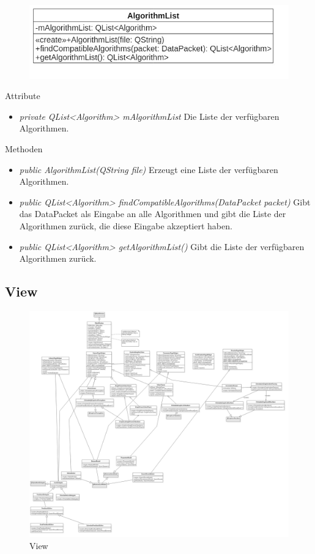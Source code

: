 \begin{figure}[H]
\centering
\includegraphics[scale=0.5]{img/Klassendiagramm/Klassen/AlgorithmList}
\label{fig:algorithmList}
\end{figure}

Attribute
\begin{itemize}
\item\textit{private QList<Algorithm> mAlgorithmList} Die Liste der verfügbaren Algorithmen.
\end{itemize}

Methoden
\begin{itemize}
\item\textit{public AlgorithmList(QString file)} Erzeugt eine Liste der verfügbaren Algorithmen.
\item\textit{public QList<Algorithm> findCompatibleAlgorithms(DataPacket packet)} Gibt das DataPacket als Eingabe an alle Algorithmen und gibt die Liste der Algorithmen zurück, die diese Eingabe akzeptiert haben.
\item\textit{public QList<Algorithm> getAlgorithmList()} Gibt die Liste der verfügbaren Algorithmen zurück.
\end{itemize}

\pagebreak

\subsection{View}

\begin{figure}[H]
\includegraphics[width=1\linewidth]{img/Klassendiagramm/View}
\caption{View}
\label{fig:view}
\end{figure}


